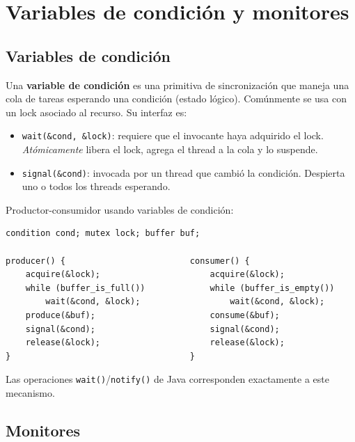 \documentclass[11pt,a4paper]{article}
\begin{document}
\section{Variables de condición y monitores}

\subsection{Variables de condición}

\begin{definicion}
Una \textbf{variable de condición} es una primitiva de sincronización
que maneja una cola de tareas esperando una condición (estado
lógico). Comúnmente se usa con un lock asociado al recurso. Su
interfaz es:
\begin{itemize}[leftmargin=*,nosep]
    \item \texttt{wait(\&cond, \&lock)}: requiere que el invocante haya
        adquirido el lock. \emph{Atómicamente} libera el lock, agrega
        el thread a la cola y lo suspende.
    \item \texttt{signal(\&cond)}: invocada por un thread que cambió
        la condición. Despierta uno o todos los threads esperando.
\end{itemize}
\end{definicion}

Productor-consumidor usando variables de condición:

\begin{lstlisting}[style=cstyle]
condition cond; mutex lock; buffer buf;

producer() {                         consumer() {
    acquire(&lock);                      acquire(&lock);
    while (buffer_is_full())             while (buffer_is_empty())
        wait(&cond, &lock);                  wait(&cond, &lock);
    produce(&buf);                       consume(&buf);
    signal(&cond);                       signal(&cond);
    release(&lock);                      release(&lock);
}                                    }
\end{lstlisting}

Las operaciones \texttt{wait()}/\texttt{notify()} de Java
corresponden exactamente a este mecanismo.

\subsection{Monitores}
\end{document}
